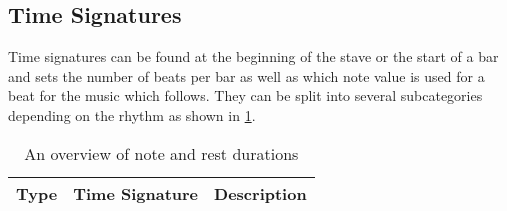 \subsection{Time Signatures}
\label{sec:music-theory-time-signatures}

Time signatures can be found at the beginning of the stave or the start of a bar and sets the number of beats per bar as well as which note value is used for a beat for the music which follows. They can be split into several subcategories depending on the rhythm as shown in \cref{table:time-signatures}.

\begin{table}[H]
    \renewcommand{\arraystretch}{1.8}
    \centering
    \begin{tabularx}{.8\textwidth}{ l l l }
        \toprule
        Type & Time Signature & Description \\
        \midrule
        \bottomrule
    \end{tabularx}
    \caption{An overview of note and rest durations}
    \label{table:time-signatures}
\end{table}

